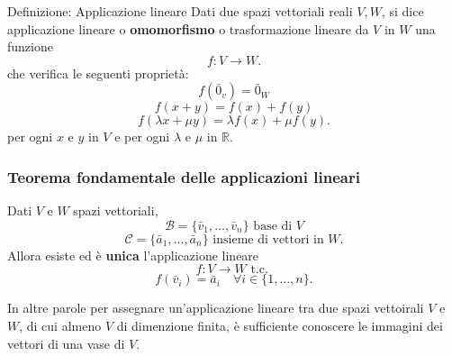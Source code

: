 \documentclass[x11names]{article}
\begin{document}
\begin{center}
\colorbox{myblue}{\begin{minipage}{5.75in}
\begin{blues}{Definizione: Applicazione lineare}
	Dati due spazi vettoriali reali $V,W$, si dice applicazione lineare o \textbf{omomorfismo} o trasformazione lineare da $V$ in  $W$ una funzione
\[
f: V \longrightarrow W 
.\] 
che verifica le seguenti proprietà:
\[
f\left(\bar{0}_{v}\right) = \bar{0}_{W}
\] 
\[
f\left(x+y\right) = f\left(x\right) + f\left(y\right)
\] 
\[
f\left(\lambda x + \mu y\right) = \lambda f\left(x\right) + \mu f\left(y\right) 
.\] 
per ogni $x$ e  $y$ in $V$ e per ogni $\lambda$ e $\mu$ in $\mathbb{R}$.
\end{blues}
\end{minipage}}        
\end{center}
\begin{center}
	\colorbox{myred}{\begin{minipage}{5.75in}
			\begin{redes}{}
				\subsubsection{Teorema fondamentale delle applicazioni lineari}
				Dati $V$ e  $W$ spazi vettoriali,
				\[
				\mathscr{B} = \{\bar{v}_{1},\dots,\bar{v}_{n}\} \text{ base di }V
				\] 
				\[
				\mathscr{C} = \{\bar{a}_{1},\dots,\bar{a}_{n}\} \text{ insieme di vettori in }W
				.\] 
				Allora esiste ed è \textbf{unica} l'applicazione lineare
				\[
				f: V \longrightarrow W \text{ t.c. }
				\] 
				\[
				f\left(\bar{v}_{i}\right) = \bar{a}_{i} \quad \forall i \in \{1,\dots,n\}
				.\] 
			\end{redes}
	\end{minipage}}        
\end{center}

In altre parole per assegnare un'applicazione lineare tra due spazi vettoirali $V$ e $W$, di cui almeno $V$ di dimenzione finita, è sufficiente conoscere le immagini dei vettori di una vase di $V$.
\end{document}
